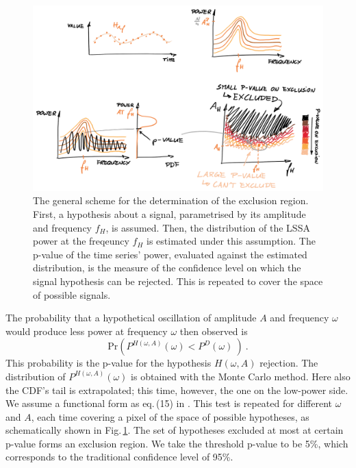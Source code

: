 \begin{figure}
  \centering \includegraphics[width=\linewidth]{gfx/axions/exclusion_region.png}
  \caption{The general scheme for the determination of the exclusion region. First, a hypothesis about a signal, parametrised by its amplitude and frequency $f_H$, is assumed. Then, the distribution of the LSSA power at the freqeuncy $f_H$ is estimated under this assumption. The p-value of the time series' power, evaluated against the estimated distribution, is the measure of the confidence level on which the signal hypothesis can be rejected. This is repeated to cover the space of possible signals.}
  \label{fig:exclusion_region}
\end{figure}

The probability that a hypothetical oscillation of amplitude $A$ and frequency $\omega$ would produce less power at frequency $\omega$ then observed is
\begin{equation}
  \mathrm{Pr}\left( P^{H(\omega, A)}(\omega) < P^D(\omega)\ \right) \ .
\end{equation}
This probability is the p-value for the hypothesis $H(\omega, A)$ rejection. The distribution of $P^{H(\omega, A)}(\omega)$ is obtained with the Monte Carlo method. Here also the CDF's tail is extrapolated; this time, however, the one on the low-power side. We assume a functional form as eq.\,(15) in \cite{Scargle1982}. This test is repeated for different $\omega$ and $A$, each time covering a pixel of the space of possible hypotheses, as schematically shown in Fig.\,\ref{fig:exclusion_region}. The set of hypotheses excluded at most at certain p-value forms an exclusion region. We take the threshold p-value to be 5\%, which corresponds to the traditional confidence level of 95\%.

